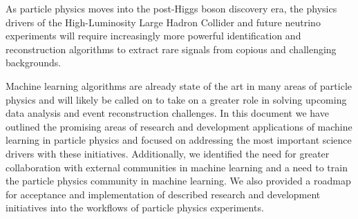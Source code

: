 As particle physics moves into the post-Higgs boson discovery era, the physics drivers of the High-Luminosity Large Hadron Collider and future neutrino experiments will require increasingly more powerful identification and reconstruction algorithms to extract rare signals from copious and challenging backgrounds.

Machine learning algorithms are already state of the art in many areas of particle physics and will likely be called on to take on a greater role in solving upcoming data analysis and event reconstruction challenges.
In this document we have outlined the promising areas of research and development applications of machine learning in particle physics and focused on addressing the most important science drivers with these initiatives.
Additionally, we identified the need for greater collaboration with external communities in machine learning and a need to train the particle physics community in machine learning.
We also provided a roadmap for acceptance and implementation of described research and development initiatives into the workflows of particle physics experiments.
